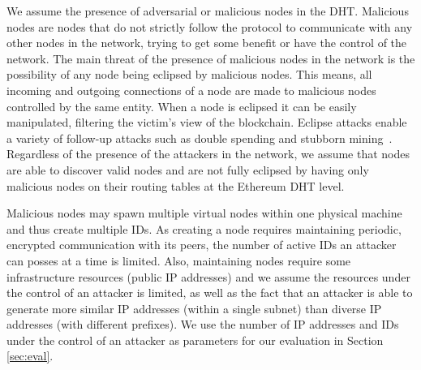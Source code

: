 We assume the presence of adversarial or malicious nodes in the DHT. 
Malicious nodes are nodes that do not strictly follow the protocol to communicate with any other nodes in the network,  trying to get some benefit or have the control of the network.
The main threat of the presence of malicious nodes in the network is the possibility of any node being eclipsed by malicious nodes.
This means,  all incoming and outgoing connections of a node are made to malicious nodes controlled by the same entity. 
When a node is eclipsed it can be easily manipulated,
filtering the victim’s view of the blockchain.  
Eclipse attacks
enable a variety of follow-up attacks such as double spending
and stubborn mining~\cite{stubborn}.
Regardless of the presence of the attackers in the network, 
we assume that nodes are able to discover valid nodes and are not fully eclipsed by having only malicious nodes on their routing tables at the Ethereum DHT level.
%

Malicious nodes may spawn multiple virtual nodes within one physical machine and thus create multiple IDs. 
As creating a node requires maintaining periodic,  encrypted communication with its peers,  the number of active IDs an attacker can posses at a time is limited. 
Also,  maintaining nodes require some infrastructure resources (public IP addresses) and we assume the resources under the control of an attacker is limited, as well as the fact 
that an attacker is able to generate more similar IP addresses (within a single subnet) than diverse IP addresses (with different prefixes). 
We use the number of IP addresses and IDs under the control of an attacker as parameters for our evaluation in Section \ref{sec:eval}.



